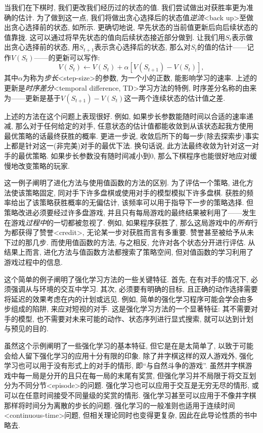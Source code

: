 当我们在下棋时, 我们更改我们经历过的状态的值. 我们尝试做出对获胜率更为准确的估计. 为了做到这一点, 我们将做出贪心选择后的状态值\emph{逆流}<back up>至做出贪心选择前的状态, 如所示. 更确切地说, 早先状态的当前值更新后向后续状态的值靠拢. 这可以通过将早先状态的值向后续状态接近部分做到. 让我们用$S_t$表示做出贪心选择前的状态, 用$S_{t + 1}$表示贪心选择后的状态, 那么对$S_t$的值的估计——记作$V(S_t)$——的更新可以写作:
\begin{equation*}
V(S_t) \leftarrow V(S_t) + \alpha[V(S_{t + 1}) - V(S_t)]​,
\end{equation*}
其中$\alpha$为称为\emph{步长}<step-size>的参数, 为一个小的正数, 能影响学习的速率. 上述的更新是\emph{时序差分}<temporal difference, TD>学习方法的特例, 时序差分名称的由来为——更新是基于$V(S_{t + 1}) - V(S_t)$这一两个连续状态的估计值之差.

上述的方法在这个问题上表现很好. 例如, 如果步长参数能随时间以合适的速率递减, 那么对于任何给定的对手, 任意状态的估计值都能收敛到从该状态起我方使用最优策略的话最终获胜的概率. 更进一步说, 收敛后所下的每一步(除去探索步)事实上都是针对这一(非完美)对手的最优下法. 换句话说, 此方法最终收敛为针对这一对手的最优策略. 如果步长参数没有随时间减小到0, 那么下棋程序也能很好地应对缓慢地改变策略的玩家.

这一例子阐明了进化方法与使用值函数的方法的区别. 为了评估一个策略, 进化方法使该策略固定, 同对手下许多盘棋或使用对手的模型模拟下许多盘棋. 获胜的频率给出了该策略获胜概率的无偏估计, 该频率可以用于指导下一步的策略选择. 但策略改进必须要经过许多盘游戏, 并且只有每局游戏的最终结果被利用了——发生在游戏\emph{过程中}的一切都被忽视了. 例如, 如果程序获胜了, 那么这局游戏中的\emph{所有}行为都获得了赞誉<credit>, 无论某一步对获胜而言有多重要. 赞誉甚至被给予从未下过的那几步. 而使用值函数的方法, 与之相反, 允许对各个状态分开进行评估. 从结果上而言, 进化方法与值函数方法都搜索了策略空间, 但对值函数的学习利用了游戏过程中的信息.

这个简单的例子阐明了强化学习方法的一些关键特征. 首先, 在有对手的情况下, 必须强调从与环境的交互中学习. 其次, 必须要有明确的目标, 且正确的动作选择需要将延迟的效果考虑在内的计划或远见. 例如, 简单的强化学习程序可能会学会由多步组成的陷阱, 来应对短视的对手. 这是强化学习方法的一个显著特征: 其不需要对手的模型, 也不需要对未来可能的动作、状态序列进行显式搜索, 就可以达到计划与预见的目的.

虽然这个示例阐明了一些强化学习的基本特征, 但它是在是太简单了, 以致于可能会给人留下强化学习的应用十分有限的印象. 除了井字棋这样的双人游戏外, 强化学习也可以用于没有形式上的对手的情形, 即``与自然斗争的游戏''. 虽然井字棋游戏中每一局是分开的且只在每一局的末尾有奖赏, 但强化学习并不局限于将交互划分为不同分节<episode>的问题. 强化学习也可以应用于交互是无穷无尽的情形, 或可以在任意时间接受不同量级的奖赏的情形. 强化学习甚至可以应用于不像井字棋那样将时间分为离散的步长的问题. 强化学习的一般准则也适用于连续时间<continuous-time>问题, 但相关理论同时也变得更复杂, 因此在此导论性质的书中略去.

